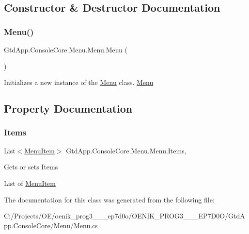 \subsection{Constructor \& Destructor Documentation}
\mbox{\label{class_gtd_app_1_1_console_core_1_1_menu_1_1_menu_a5a00d8068f35986cd40d11f92fcf5efe}} 
\subsubsection{\texorpdfstring{Menu()}{Menu()}}
{\footnotesize\ttfamily Gtd\+App.\+Console\+Core.\+Menu.\+Menu.\+Menu (\begin{DoxyParamCaption}{ }\end{DoxyParamCaption})}



Initializes a new instance of the \mbox{\hyperlink{class_gtd_app_1_1_console_core_1_1_menu_1_1_menu}{Menu}} class. \mbox{\hyperlink{class_gtd_app_1_1_console_core_1_1_menu_1_1_menu}{Menu}} 



\subsection{Property Documentation}
\mbox{\label{class_gtd_app_1_1_console_core_1_1_menu_1_1_menu_a3a6c6080f59624a65fd871a80f96d106}} 
\subsubsection{\texorpdfstring{Items}{Items}}
{\footnotesize\ttfamily List$<$\mbox{\hyperlink{class_gtd_app_1_1_console_core_1_1_menu_1_1_menu_item}{Menu\+Item}}$>$ Gtd\+App.\+Console\+Core.\+Menu.\+Menu.\+Items\hspace{0.3cm}{\ttfamily [get]}, {\ttfamily [set]}}



Gets or sets Items 

List of \mbox{\hyperlink{class_gtd_app_1_1_console_core_1_1_menu_1_1_menu_item}{Menu\+Item}}

The documentation for this class was generated from the following file\+:\begin{DoxyCompactItemize}
\item 
C\+:/\+Projects/\+O\+E/oenik\+\_\+prog3\+\_\+\_\+\_\+ep7d0o/\+O\+E\+N\+I\+K\+\_\+\+P\+R\+O\+G3\+\_\+\_\+\_\+\+E\+P7\+D0\+O/\+Gtd\+App.\+Console\+Core/\+Menu/Menu.\+cs\end{DoxyCompactItemize}
